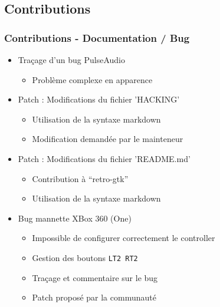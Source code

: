 \documentclass{beamer}
\begin{document}
\subsection{Contributions}
\begin{frame}
  \frametitle{Contributions - Documentation / Bug}
  \begin{itemize}
  \item Traçage d'un bug PulseAudio
    \begin{itemize}
      \item Problème complexe en apparence
    \end{itemize}
  \item Patch : Modifications du fichier 'HACKING'
    \begin{itemize}
    \item Utilisation de la syntaxe markdown
    \item Modification demandée par le mainteneur
    \end{itemize}
  \item Patch : Modifications du fichier 'README.md'
    \begin{itemize}
    \item Contribution à ``retro-gtk''
    \item Utilisation de la syntaxe markdown
    \end{itemize}
  \item Bug mannette XBox 360 (One)
    \begin{itemize}
    \item Impossible de configurer correctement le controller
    \item Gestion des boutons \texttt{LT2 RT2}
    \item Traçage et commentaire sur le bug
    \item Patch proposé par la communauté
    \end{itemize}
  \end{itemize}
\end{frame}
\end{document}
